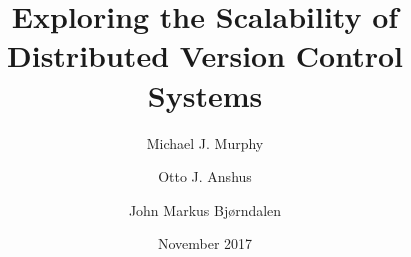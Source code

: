 \documentclass[
    usenglish,
]{nik}
\title{Exploring the Scalability of Distributed Version Control Systems}
\author{Michael J. Murphy \and Otto J. Anshus \and John Markus Bjørndalen}
\date{November 2017}
\begin{document}
\maketitle

\begin{abstract}

\end{abstract}








\printbibliography[]

\listoftodos

\ifoptionfinal{}{
    
}
\end{document}
